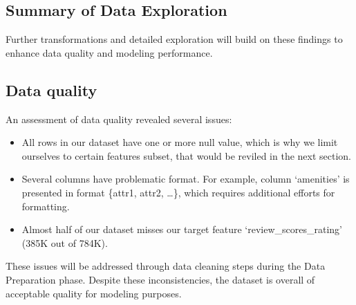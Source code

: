 \subsection{Summary of Data Exploration}\label{sec:dataExplorationSummary}

Further transformations and detailed exploration will build on these findings to enhance data quality and modeling performance.


\subsection{Data quality}\label{sec:dataQuality}
An assessment of data quality revealed several issues:

\begin{itemize}
    \item All rows in our dataset have one or more null value, which is why we limit ourselves to certain features subset, that would be reviled in the next section.
    \item Several columns have problematic format. For example, column `amenities' is presented in format \{attr1, attr2, \ldots \}, which requires additional efforts for formatting.
    \item Almost half of our dataset misses our target feature `review\_scores\_rating' (385K out of 784K).
\end{itemize}

These issues will be addressed through data cleaning steps during the Data Preparation phase. Despite these inconsistencies, the dataset is overall of acceptable quality for modeling purposes.
